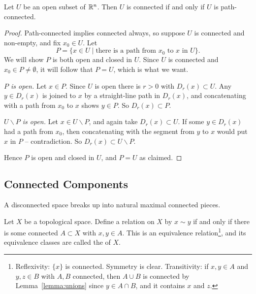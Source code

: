 \documentclass[a4paper]{scrartcl}
\begin{document}
\begin{theorem}\label{thm:openconn}
    Let $U$ be an open subset of $\mathbb{R}^n$. Then $U$ is connected if and only if $U$ is path-connected.
\end{theorem}
\begin{proof}
    Path-connected implies connected always, so suppose $U$ is connected and non-empty, and fix $x_0 \in U$. Let
    $$
    P = \{x \in U \mid \text{there is a path from } x_0 \text{ to } x \text{ in } U\}.
    $$
    We will show $P$ is both open and closed in $U$. Since $U$ is connected and $x_0 \in P \neq \emptyset$, it will follow that $P = U$, which is what we want.

    \emph{$P$ is open.} Let $x \in P$. Since $U$ is open there is $r > 0$ with $D_r(x) \subset U$. Any $y \in D_r(x)$ is joined to $x$ by a straight-line path in $D_r(x)$, and concatenating with a path from $x_0$ to $x$ shows $y \in P$. So $D_r(x) \subset P$.

    \emph{$U \backslash P$ is open.} Let $x \in U \backslash P$, and again take $D_r(x) \subset U$. If some $y \in D_r(x)$ had a path from $x_0$, then concatenating with the segment from $y$ to $x$ would put $x$ in $P$ -- contradiction. So $D_r(x) \subset U \backslash P$.

    Hence $P$ is open and closed in $U$, and $P = U$ as claimed.
\end{proof}

\subsection{Connected Components}

A disconnected space breaks up into natural maximal connected pieces.

\begin{definition}
    Let $X$ be a topological space. Define a relation on $X$ by $x \sim y$ if and only if there is some connected $A \subset X$ with $x, y \in A$. This is an equivalence relation\footnote{Reflexivity: $\{x\}$ is connected. Symmetry is clear. Transitivity: if $x, y \in A$ and $y, z \in B$ with $A, B$ connected, then $A \cup B$ is connected by Lemma~\ref{lemma:unions} since $y \in A \cap B$, and it contains $x$ and $z$.}, and its equivalence classes are called the  of $X$.
\end{definition}
\end{document}
